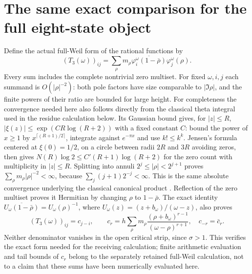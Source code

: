 \section{The same exact comparison for the full eight-state object}
Define the actual full-Weil form of the rational functions by
\[
 (T_3(\omega))_{ij}
 =\sum_{\rho}m_\rho\overline{\varphi_i^\omega(1-\bar\rho)}
                                     \varphi_j^\omega(\rho).
 \tag{RW12}
\]
Every sum includes the complete nontrivial zero multiset.
For fixed $\omega,i,j$ each summand is $O(|\rho|^{-2})$:
both pole factors have size comparable to $|\Im\rho|$, and
the finite powers of their ratio are bounded for large height.
For completeness the convergence needed here also follows
directly from the classical theta integral used in the residue
calculation below. Its Gaussian bound gives, for $|z|\le R$,
$|\xi(z)|\le\exp(CR\log(R+2))$ with a fixed constant $C$:
bound the power of $x\ge1$ by $x^{\lceil(R+1)/2\rceil}$,
integrate against $e^{-\pi x}$ and use $k!\le k^k$.
Jensen's formula centered at $\xi(0)=1/2$, on a circle between
radii $2R$ and $3R$ avoiding zeros, then gives
$N(R)\log2\le C'(R+1)\log(R+2)$ for the zero count with
multiplicity in $|z|\le R$. Splitting into annuli
$2^j\le|\rho|<2^{j+1}$ proves
$\sum_\rho m_\rho|\rho|^{-2}<\infty$, because
$\sum_j(j+1)2^{-j}<\infty$. This is the same absolute
convergence underlying the classical canonical product
\cite[25.2.12]{DLMFXi}. Reflection of the zero multiset
proves it Hermitian by changing $\rho$ to $1-\bar\rho$.
The exact identity
$\overline{U_\omega(1-\bar\rho)}=U_\omega(\rho)^{-1}$,
where $U_\omega(z)=(z+b_\omega)/(\omega-z)$, also proves
\[
 (T_3(\omega))_{ij}=c_{j-i},\qquad
 c_r=h\sum_\rho m_\rho
       \frac{(\rho+b_\omega)^{r-1}}{(\omega-\rho)^{r+1}},
 \quad c_{-r}=\bar c_r.
 \tag{RW13}
\]
Neither denominator vanishes in the open critical strip, since
$\sigma>1$. This verifies the exact form needed for the
receiving calculation; finite arithmetic evaluation and tail
bounds of $c_r$ belong to the separately retained full-Weil
calculation, not to a claim that these sums have been numerically
evaluated here.

